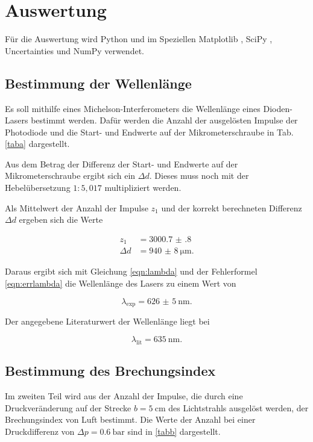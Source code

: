 \section{Auswertung}
\label{sec:Auswertung}

Für die Auswertung wird Python und im Speziellen
Matplotlib \cite{matplotlib}, SciPy \cite{scipy},
Uncertainties \cite{uncertainties} und NumPy \cite{numpy} verwendet.

\subsection{Bestimmung der Wellenlänge}
Es soll mithilfe eines Michelson-Interferometers die Wellenlänge eines Dioden-Lasers bestimmt werden. 
Dafür werden die Anzahl der ausgelösten Impulse der Photodiode und die Start- und Endwerte auf der Mikrometerschraube in Tab. \ref{taba} dargestellt.  



\noindent Aus dem Betrag der Differenz der Start- und Endwerte auf der Mikrometerschraube ergibt sich ein $\Delta d$. Dieses muss noch mit der Hebelübersetzung $1:5,017$  multipliziert werden. 

\noindent Als Mittelwert der Anzahl der Impulse $z_1$ und der korrekt berechneten Differenz $\Delta d$ ergeben sich die Werte 

\begin{align*} 
   z_1 &= \num{3000.7(8)} \\
   \Delta d &= \SI{940(8)}{\micro\meter}.
\end{align*}

\noindent Daraus ergibt sich mit Gleichung \eqref{eqn:lambda} und der Fehlerformel \eqref{eqn:errlambda} die Wellenlänge des Lasers zu einem Wert von 

\begin{equation*}
    \lambda_\text{exp} = \SI{626(5)}{\nano\meter}.
\end{equation*}

\noindent Der angegebene Literaturwert der Wellenlänge liegt bei 

\begin{equation*}
    \lambda_\text{lit} = \SI{635}{\nano\meter}.
\end{equation*}

\subsection{Bestimmung des Brechungsindex}
Im zweiten Teil wird aus der Anzahl der Impulse, die durch eine Druckveränderung auf der Strecke $b = \SI{5}{\centi\meter}$ des Lichtstrahls ausgelöst werden, der Brechungsindex von Luft bestimmt. 
Die Werte der Anzahl bei einer Druckdifferenz von $\Delta p = \SI{0.6}{\bar}$ sind in \ref{tabb} dargestellt.

